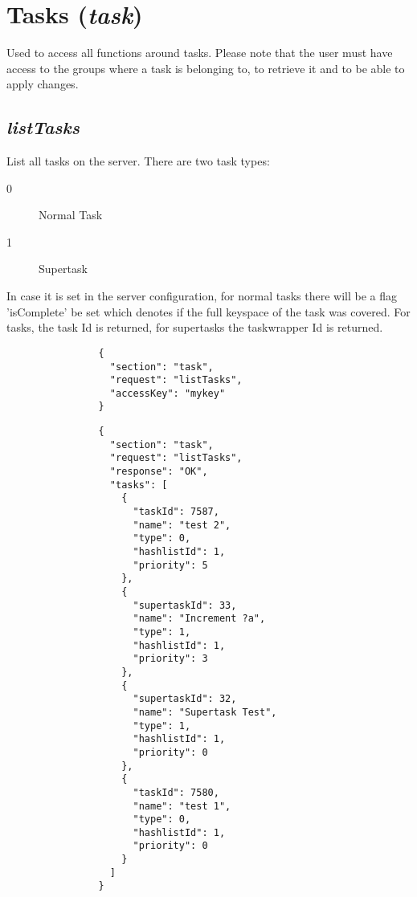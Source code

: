 	\section*{Tasks (\textit{task})}
		Used to access all functions around tasks. Please note that the user must have access to the groups where a task is belonging to, to retrieve it and to be able to apply changes.
		\subsection*{\textit{listTasks}}
			List all tasks on the server. There are two task types:
			\begin{description}
				\item[0] Normal Task
				\item[1] Supertask
			\end{description}
			In case it is set in the server configuration, for normal tasks there will be a flag 'isComplete' be set which denotes if the full keyspace of the task was covered.
			For tasks, the task Id is returned, for supertasks the taskwrapper Id is returned.
			{
				\color{blue}
				\begin{verbatim}
				{
				  "section": "task",
				  "request": "listTasks",
				  "accessKey": "mykey"
				}
				\end{verbatim}
			}
			{
				\color{OliveGreen}
				\begin{verbatim}
				{
				  "section": "task",
				  "request": "listTasks",
				  "response": "OK",
				  "tasks": [
				    {
				      "taskId": 7587,
				      "name": "test 2",
				      "type": 0,
				      "hashlistId": 1,
				      "priority": 5
				    },
				    {
				      "supertaskId": 33,
				      "name": "Increment ?a",
				      "type": 1,
				      "hashlistId": 1,
				      "priority": 3
				    },
				    {
				      "supertaskId": 32,
				      "name": "Supertask Test",
				      "type": 1,
				      "hashlistId": 1,
				      "priority": 0
				    },
				    {
				      "taskId": 7580,
				      "name": "test 1",
				      "type": 0,
				      "hashlistId": 1,
				      "priority": 0
				    }
				  ]
				}
				\end{verbatim}
			}
